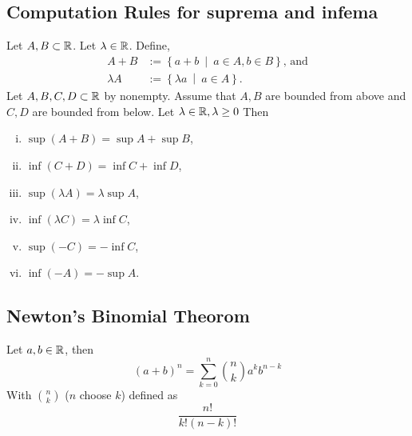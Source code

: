 \subsection{Computation Rules for suprema and infema}
Let $A, B \subset \mathbb{R}$. Let $\lambda \in \mathbb{R}$. Define,
\begin{align*}
    A + B &:= \left\{ a + b\ \middle|\ a \in A, b \in B \right\}\text{, and}\\
    \lambda A &:= \left\{ \lambda a\ \middle|\ a \in A \right\}.
\end{align*}
\uprop Let $A,B,C,D \subset \mathbb{R}$ by nonempty. Assume that $A,B$ are bounded from
above and $C,D$ are bounded from below. Let $\lambda \in \mathbb{R}, \lambda \geq 0$ Then
\begin{enumerate}[(i)]
    \item $\sup(A + B) = \sup A + \sup B$,
    \item $\inf(C + D) = \inf C + \inf D$,
    \item $\sup(\lambda A) = \lambda \sup A$,
    \item $\inf(\lambda C) = \lambda \inf C$,
    \item $\sup(-C) = - \inf C$,
    \item $\inf(-A) = - \sup A$.
\end{enumerate}


\subsection{Newton's Binomial Theorom}
\uthm Let $a, b \in \mathbb{R}$, then
\[
    (a+b)^n = \sum_{k = 0}^{n} \binom{n}{k} a^k b^{n-k}
\]
With $\binom{n}{k}$ ($n$ choose $k$) defined as
\[
    \frac{n!}{k!(n-k)!}
\]